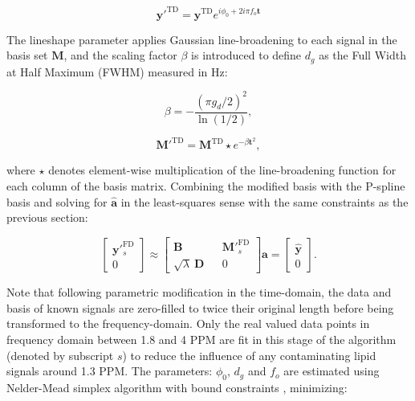 \documentclass[num-refs]{wiley-article}
\begin{document}
\begin{equation}
  \mathbf{y'}^{\mathrm{TD}} = \mathbf{y}^{\mathrm{TD}} e^{i \phi_{0} + 2 i \pi f_{o} \mathbf{t}}
\end{equation}

The lineshape parameter applies Gaussian line-broadening to each signal in the basis set $\mathbf{M}$, and the scaling factor $\beta$ is introduced to define $d_{g}$ as the Full Width at Half Maximum (FWHM) measured in Hz:

\begin{equation}
  \beta = -\frac{{(\pi g_{d} / 2)}^{2}}{\ln(1/2)},
\end{equation}

\begin{equation}
  \mathbf{M}'^{\mathrm{TD}} = \mathbf{M}^{\mathrm{TD}} \star e^{-\beta \mathbf{t}^{2}},
\end{equation}

where $\star$ denotes element-wise multiplication of the line-broadening function for each column of the basis matrix. Combining the modified basis with the P-spline basis and solving for $\hat{\mathbf{a}}$ in the least-squares sense with the same constraints as the previous section:

\begin{equation}
  \begin{bmatrix}
    \textbf{y}'^{\mathrm{FD}}_{s} \\ 0
  \end{bmatrix}
  \approx
  \begin{bmatrix}
    \textbf{B} && \textbf{M}'^{\mathrm{FD}}_{s} \\ \sqrt{\lambda} \ \textbf{D} && 0
  \end{bmatrix} \hat{\mathbf{a}} =
  \begin{bmatrix}
    \hat{\textbf{y}} \\ 0
  \end{bmatrix}.
  \label{linear_fit}
\end{equation}

Note that following parametric modification in the time-domain, the data and basis of known signals are zero-filled to twice their original length before being transformed to the frequency-domain. Only the real valued data points in frequency domain between 1.8 and 4 PPM are fit in this stage of the algorithm (denoted by subscript $s$) to reduce the influence of any contaminating lipid signals around 1.3 PPM. The parameters: $\phi_{0}$, $d_{g}$ and $f_{o}$ are estimated using Nelder-Mead simplex algorithm with bound constraints \cite{Box1965}, minimizing:
\end{document}
